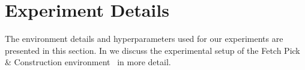 

\section{Experiment Details} 
\label{sec:experiment_details}
The environment details and hyperparameters used for our experiments are presented in this section. In  we discuss the experimental setup of the Fetch Pick \& Construction environment~\citep{li2020towards} in more detail. 
